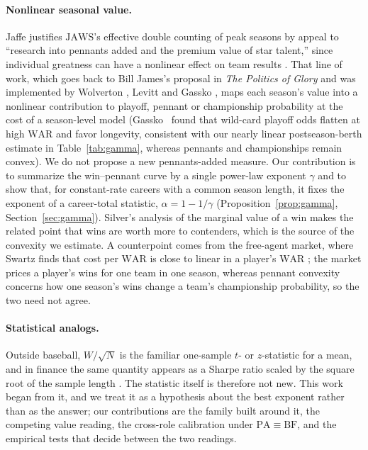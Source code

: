 \documentclass[11pt,letterpaper]{article}
\theoremstyle{plain}
\theoremstyle{definition}
\theoremstyle{remark}
\newcommand{\WAR}{\mathrm{WAR}}
\newcommand{\PA}{\mathrm{PA}}
\newcommand{\BF}{\mathrm{BF}}
\newcommand{\JAWS}{\mathrm{JAWS}}
\begin{document}
\paragraph{Nonlinear seasonal value.} Jaffe justifies $\JAWS$'s effective double counting of peak seasons by appeal to ``research into pennants added and the premium value of star talent,'' since individual greatness can have a nonlinear effect on team results \cite{jaffe2017si}. That line of work, which goes back to Bill James's proposal in \emph{The Politics of Glory} \cite{james1994} and was implemented by Wolverton \cite{wolverton2002}, Levitt \cite{levitt2005} and Gassko \cite{gassko2007}, maps each season's value into a nonlinear contribution to playoff, pennant or championship probability at the cost of a season-level model (Gassko~\cite{gassko2007} found that wild-card playoff odds flatten at high $\WAR$ and favor longevity, consistent with our nearly linear postseason-berth estimate in Table~\ref{tab:gamma}, whereas pennants and championships remain convex). We do not propose a new pennants-added measure. Our contribution is to summarize the win--pennant curve by a single power-law exponent $\gamma$ and to show that, for constant-rate careers with a common season length, it fixes the exponent of a career-total statistic, $\alpha = 1 - 1/\gamma$ (Proposition~\ref{prop:gamma}, Section~\ref{sec:gamma}). Silver's analysis of the marginal value of a win \cite{silver2006} makes the related point that wins are worth more to contenders, which is the source of the convexity we estimate. A counterpoint comes from the free-agent market, where Swartz finds that cost per $\WAR$ is close to linear in a player's $\WAR$ \cite{swartz2017}; the market prices a player's wins for one team in one season, whereas pennant convexity concerns how one season's wins change a team's championship probability, so the two need not agree.

\paragraph{Statistical analogs.} Outside baseball, $W/\sqrt N$ is the familiar one-sample $t$- or $z$-statistic for a mean, and in finance the same quantity appears as a Sharpe ratio scaled by the square root of the sample length \cite{lo2002}. The statistic itself is therefore not new. This work began from it, and we treat it as a hypothesis about the best exponent rather than as the answer; our contributions are the family built around it, the competing value reading, the cross-role calibration under $\PA \equiv \BF$, and the empirical tests that decide between the two readings.
\end{document}

